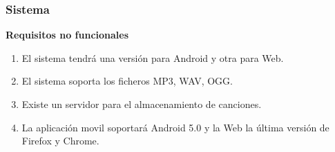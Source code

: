 \documentclass[12pt]{article}%
\begin{document}
\subsubsection{Sistema}
\textbf{Requisitos no funcionales}
\begin{enumerate}
	\item El sistema tendr\'a una versi\'on para Android y otra para Web.
	\item El sistema soporta los ficheros MP3, WAV, OGG.
	\item Existe un servidor para el almacenamiento de canciones.
	\item La aplicaci\'on movil soportar\'a Android 5.0 y la Web la \'ultima versi\'on de Firefox y Chrome.
\end{enumerate}
\end{document}

